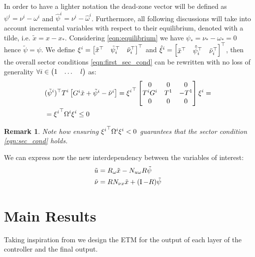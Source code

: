 \documentclass{ifacconf}
\theoremstyle{plain}
\newtheorem{remark}{Remark}
\begin{document}
In order to have a lighter notation the dead-zone vector  will be defined as $\psi^i = \nu^i - \omega^i$ and $\hat{\psi}^i = \nu^i - \hat{\omega}^i$. Furthermore, all following discussions will take into account incremental variables with respect to their equilibrium, denoted with a tilde, i.e. $\tilde{x} = x - x_*$. Considering \eqref{eqn:equilibrium} we have $\psi_* = \nu_* - \omega_* = 0$ hence $\tilde{\psi} = \psi$. We define $\xi^i = \left[\begin{matrix}\tilde{x}^\top & \tilde{\psi}_i^\top & \tilde{\nu}_i^\top\end{matrix}\right]^\top$ and $\hat{\xi}^i = \left[\begin{matrix}\tilde{x}^\top & \hat{\tilde{\psi}}_i^\top & \tilde{\nu}_i^\top\end{matrix}\right]^\top$, then the overall sector conditions \eqref{eqn:first_sec_cond} can be rewritten with no loss of generality $\forall i \in \left(\begin{matrix}1 & \dots & l\end{matrix}\right)$ as:
\begin{equation}\label{eqn:sec_cond}
\begin{aligned}
    &({\tilde{\psi}^i})^\top T^i \left[\begin{matrix}G^i \tilde{x} + \tilde{\psi}^i - \tilde{\nu}^i\end{matrix}\right] = {\xi^i}^\top \left[\begin{matrix}0 & 0 & 0\\
    T^i G^i & T^1 & -T^1\\
    0 & 0 & 0\end{matrix}\right] \xi^i = \\
    &= {\xi^i}^\top \Omega^i \xi^i \leq 0
\end{aligned}
\end{equation}

\begin{remark}\label{rem:sec-cond}
Note how ensuring ${\xi^i}^\top \Omega^i \xi^i < 0$ guarantees that the sector condition \eqref{eqn:sec_cond} holds.
\end{remark}

We can express now the new interdependency between the variables of interest:
\begin{equation}\label{eqn:incremental}
  \begin{aligned}
    \tilde{u} &= R_{\omega} \tilde{x} - N_{u \omega} R \tilde{\psi}\\
    \tilde{\nu} &= R N_{\nu x} \tilde{x} + (\operatorname{I} - R) \tilde{\psi}
  \end{aligned}
\end{equation}

\section{Main Results}

Taking inspiration from \citep[Proposition 1, Lemma 3]{css-extended} we design the ETM for the output of each layer of the controller and the final output.
\end{document}
